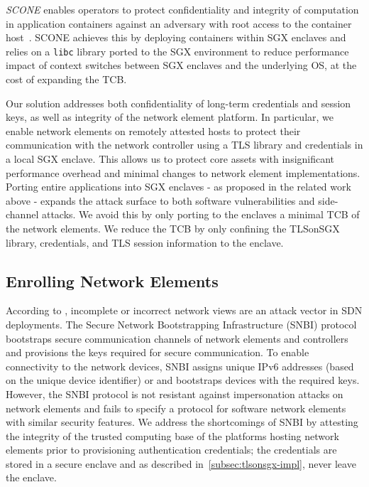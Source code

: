 {\textit{SCONE} enables operators to protect confidentiality and integrity of computation in application containers against an adversary with root access to the container host~\cite{arnautov:2016}.
SCONE achieves this by deploying containers within SGX enclaves and relies on a \texttt{libc} library ported to the SGX environment to reduce performance impact of context switches between SGX enclaves and the underlying OS, at the cost of expanding the TCB.

Our solution addresses both confidentiality of long-term credentials and session keys, as well as integrity of the network element platform. %
In particular, we enable network elements on remotely attested hosts to protect their communication with the network controller using a TLS library and credentials in a local SGX enclave.
This allows us to protect core assets with insignificant performance overhead and minimal changes to network element implementations.
Porting entire applications into SGX enclaves - as proposed in the related work above - expands the attack surface to both software vulnerabilities and side-channel attacks.
We avoid this by only porting to the enclaves a minimal TCB of the network elements.
We reduce the TCB by only confining the TLSonSGX library, credentials, and TLS session information to the enclave.


\subsection{Enrolling Network Elements}
\label{subsec:enrollment-and-key}
According to \cite{paladi:2015b}, incomplete or incorrect network views are an attack vector in SDN deployments.
The Secure Network Bootstrapping Infrastructure (SNBI) protocol~\cite{snbi} bootstraps secure communication channels of network elements and controllers and provisions the keys required for secure communication.
To enable connectivity to the network devices, SNBI assigns unique IPv6 addresses (based on the unique device identifier) or and bootstraps devices with the required keys.
However, the SNBI protocol is not resistant against impersonation attacks on network elements and fails to specify a protocol for software network elements with similar security features.
We address the shortcomings of SNBI by attesting the integrity of the trusted computing base of the platforms hosting network elements prior to provisioning authentication credentials;
the credentials are stored in a secure enclave and as described in~\ref{subsec:tlsonsgx-impl}, never leave the enclave.


}
